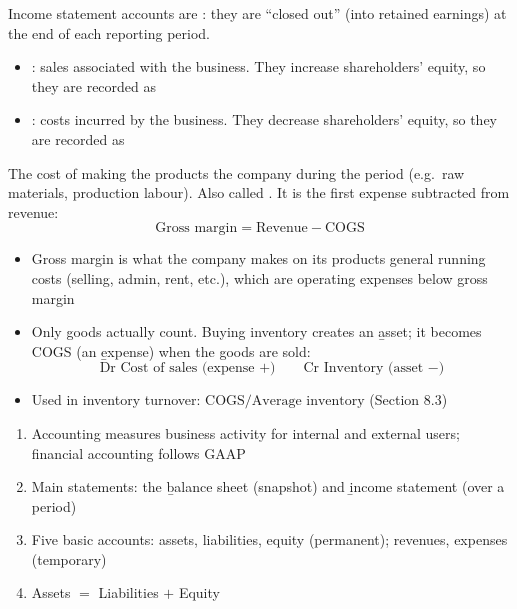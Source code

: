 Income statement accounts are : they are ``closed out'' (into
retained earnings) at the end of each reporting period.
\begin{itemize}
    \item {}: sales associated with the business. They increase shareholders' equity, so they are recorded as 
    \item {}: costs incurred by the business. They decrease shareholders' equity, so they are recorded as 
\end{itemize}

\begin{definition}
    The  cost of making the products the company 
    during the period (e.g.\ raw materials, production labour). Also called
    . It is the first expense subtracted from revenue:
    \[\boxed{\text{Gross margin} = \text{Revenue} - \text{COGS}}\]
    \begin{itemize}
        \item Gross margin is what the company makes on its products  general running costs (selling, admin, rent, etc.), which are operating expenses below gross margin
        \item Only goods actually  count. Buying inventory creates an \b{asset}; it becomes COGS (an \b{expense}) when the goods are sold:
        \[\text{Dr Cost of sales (expense } +) \qquad \text{Cr Inventory (asset } -)\]
        \item Used in inventory turnover: $\text{COGS}/\text{Average inventory}$ (Section 8.3)
    \end{itemize}
\end{definition}

\begin{enumerate}
    \item Accounting measures business activity for internal and external users; financial accounting follows GAAP
    \item Main statements: the \b{balance sheet} (snapshot) and \b{income statement} (over a period)
    \item Five basic accounts: assets, liabilities, equity (permanent); revenues, expenses (temporary)
    \item Assets $=$ Liabilities $+$ Equity
\end{enumerate}


